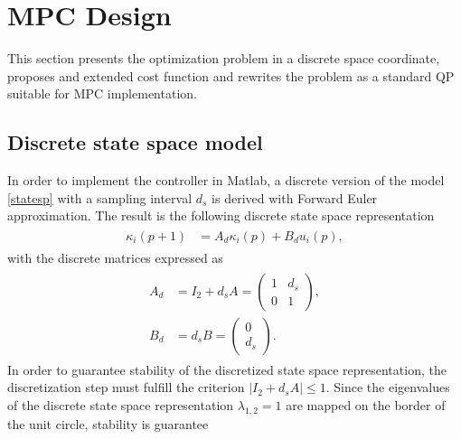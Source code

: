 \documentclass[letterpaper,10pt,conference]{ieeeconf}
\begin{document}
\section{MPC Design} \label{sec:MPC}
This section presents the optimization problem in a discrete space coordinate, proposes and extended cost function and rewrites the problem as a standard QP suitable for MPC implementation.
\subsection{Discrete state space model}
In order to implement the controller in Matlab, a discrete version of the model \eqref{statesp} with a sampling interval $d_s$ is derived with Forward Euler approximation. The result is the following discrete state space representation
\begin{align}
\label{eq:model}
\begin{split}
\kappa_i(p+1) &= A_d \kappa_i(p) + B_d u_i(p),
\end{split}
\end{align}
with the discrete matrices expressed as
\begin{align}
\label{eq:model2}
\begin{split}
    A_d &= I_2 + d_sA = \begin{pmatrix}
        1&d_s\\
        0&1
    \end{pmatrix},\\
B_d &= d_sB = \begin{pmatrix}
    0\\
    d_s
\end{pmatrix}.
\end{split}
\end{align}
In order to guarantee stability of the discretized state space representation, the discretization step must fulfill the criterion
$ |I_2 + d_s A| \leq 1$.
Since the eigenvalues of the discrete state space representation $\lambda_{1,2}=1$ are mapped on the border of the unit circle, stability is guarantee
\end{document}
